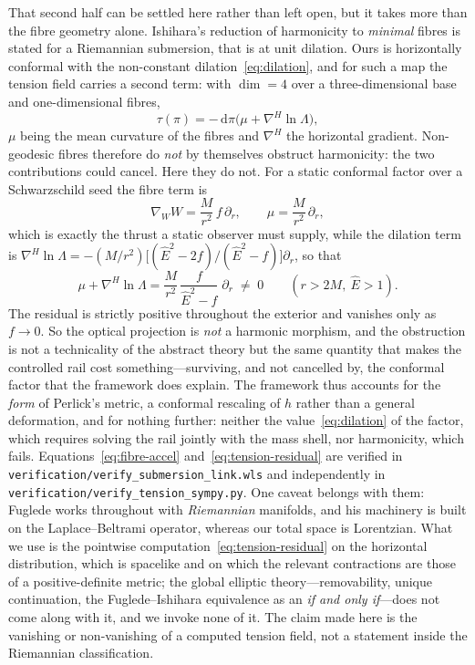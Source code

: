 \documentclass[12pt]{iopart}
\theoremstyle{plain}
\theoremstyle{definition}
\theoremstyle{remark}
\newcommand{\Ehat}{\hat E}
\newcommand{\dd}{\mathrm{d}}
\begin{document}
That second half can be settled here rather than left open, but it takes more than
the fibre geometry alone. Ishihara's reduction of harmonicity to \emph{minimal}
fibres \cite[\S1]{Ishihara1979} is stated for a Riemannian submersion, that is at
unit dilation. Ours is horizontally conformal with the non-constant
dilation~\eqref{eq:dilation}, and for such a map the tension field carries a second
term: with $\dim=4$ over a three-dimensional base and one-dimensional fibres,
\begin{equation}
    \tau(\pi)=-\,\dd\pi\big(\mu+\nabla^H\ln\Lambda\big),
    \label{eq:tension}
\end{equation}
$\mu$ being the mean curvature of the fibres and $\nabla^H$ the horizontal
gradient. Non-geodesic fibres therefore do \emph{not} by themselves obstruct
harmonicity: the two contributions could cancel. Here they do not. For a static
conformal factor over a Schwarzschild seed the fibre term is
\begin{equation}
    \nabla_WW=\frac{M}{r^2}\,f\,\partial_r ,
    \qquad \mu=\frac{M}{r^2}\,\partial_r ,
    \label{eq:fibre-accel}
\end{equation}
which is exactly the thrust a static observer must supply, while the dilation term
is $\nabla^H\ln\Lambda=-(M/r^2)\big[(\Ehat^2-2f)/(\Ehat^2-f)\big]\partial_r$, so that
\begin{equation}
    \mu+\nabla^H\ln\Lambda
      =\frac{M}{r^2}\,\frac{f}{\Ehat^2-f}\;\partial_r
      \;\neq\;0
    \qquad (r>2M,\ \Ehat>1).
    \label{eq:tension-residual}
\end{equation}
The residual is strictly positive throughout the exterior and vanishes only as
$f\to0$. So the optical projection is \emph{not} a harmonic morphism, and the
obstruction is not a technicality of the abstract theory but the same quantity that
makes the controlled rail cost something---surviving, and not cancelled by, the
conformal factor that the framework does explain. The framework thus accounts for
the \emph{form} of Perlick's
metric, a conformal rescaling of $h$ rather than a general deformation, and for
nothing further: neither the value~\eqref{eq:dilation} of the factor, which requires
solving the rail jointly with the mass shell, nor harmonicity, which fails.
Equations~\eqref{eq:fibre-accel} and~\eqref{eq:tension-residual} are verified in
\texttt{verification/verify\_submersion\_link.wls} and independently in
\texttt{verification/verify\_tension\_sympy.py}. One caveat belongs with them:
Fuglede works throughout with \emph{Riemannian} manifolds, and his machinery is
built on the Laplace--Beltrami operator, whereas our total space is Lorentzian. What
we use is the pointwise computation~\eqref{eq:tension-residual} on the horizontal
distribution, which is spacelike and on which the relevant contractions are those of
a positive-definite metric; the global elliptic theory---removability, unique
continuation, the Fuglede--Ishihara equivalence as an \emph{if and only if}---does
not come along with it, and we invoke none of it. The claim made here is the
vanishing or non-vanishing of a computed tension field, not a statement inside the
Riemannian classification.
\end{document}
